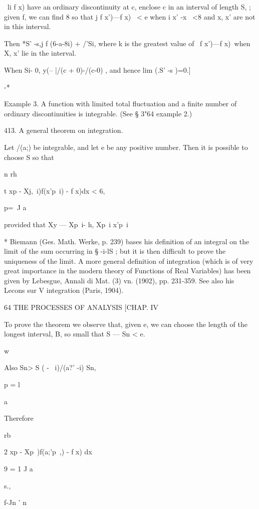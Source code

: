 \ li f x) have an ordinary discontinuity at c, enclose c in an
interval of length S, ; given f, we can find 8 so that j f x')—f x) \
< e when i x' -x \ <8 and x, x' are not in this interval.

Then *S' -s,j f (6-a-8i) + /'Si, where k is the greatest value of \ f
x')—f x)\, when X, x' lie in the interval.

When Si- 0, y(-- |/(c + 0)-/(c-0) , and hence lim (.S' -s )=0.]

 -*

Example 3. A function with limited total fluctuation and a finite
number of ordinary discontinuities is integrable. (See § 3"64 example
2.)

413. A general theorem on integration.

Let /(a;) be integrable, and let e be any positive number. Then it is
possible to choose S so that

n rh

t xp - Xj,\ i)f(x'p\ i) - f x)dx < 6,

p=\ J a

provided that Xy — Xp\ i- h, Xp\ i x'p\ i%

* Biemann (Ges. Math. Werke, p. 239) bases his definition of an
integral on the limit of the sum occurring in § -i-lS ; but it is then
difficult to prove the uniqueness of the limit. A more general
definition of integration (which is of very great importance in the
modern theory of Functions of Real Variables) has been given by
Lebesgue, Annali di Mat. (3) vn. (1902), pp. 231-359. See also his
Lecons sur V integration (Paris, 1904).



64 THE PROCESSES OF ANALYSIS [CHAP. IV

To prove the theorem we observe that, given e, we can choose the
length of the longest interval, B, so small that S — Sn < e.

w

Also Sn> S ( - \ i)/(a?' -i) Sn,

p = l

  a

Therefore



  rb

2 xp - Xp\ )f(a;'p\ ,) - f x) dx

9 = 1 J a



 s.,



  f-Jn ' n



